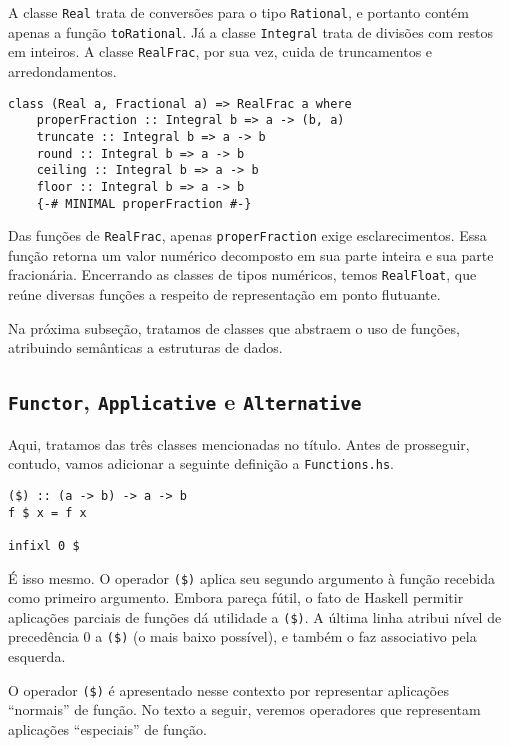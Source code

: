 \documentclass[a4paper]{article}
\begin{document}
A classe \texttt{Real} trata de conversões para o tipo \texttt{Rational}, e portanto contém apenas a função \texttt{toRational}.
Já a classe \texttt{Integral} trata de divisões com restos em inteiros.
A classe \texttt{RealFrac}, por sua vez, cuida de truncamentos e arredondamentos.

\begin{verbatim}
class (Real a, Fractional a) => RealFrac a where
	properFraction :: Integral b => a -> (b, a)
	truncate :: Integral b => a -> b
	round :: Integral b => a -> b
	ceiling :: Integral b => a -> b
	floor :: Integral b => a -> b
	{-# MINIMAL properFraction #-}
\end{verbatim}

Das funções de \texttt{RealFrac}, apenas \texttt{properFraction} exige esclarecimentos.
Essa função retorna um valor numérico decomposto em sua parte inteira e sua parte fracionária.
Encerrando as classes de tipos numéricos, temos \texttt{RealFloat}, que reúne diversas funções a respeito de representação em ponto flutuante.

Na próxima subseção, tratamos de classes que abstraem o uso de funções, atribuindo semânticas a estruturas de dados.

\subsection{\texttt{Functor}, \texttt{Applicative} e \texttt{Alternative}}

Aqui, tratamos das três classes mencionadas no título.
Antes de prosseguir, contudo, vamos adicionar a seguinte definição a \texttt{Functions.hs}.

\begin{verbatim}
($) :: (a -> b) -> a -> b
f $ x = f x

infixl 0 $
\end{verbatim}

É isso mesmo.
O operador \texttt{(\$)} aplica seu segundo argumento à função recebida como primeiro argumento.
Embora pareça fútil, o fato de Haskell permitir aplicações parciais de funções dá utilidade a \texttt{(\$)}.
A última linha atribui nível de precedência 0 a \texttt{(\$)} (o mais baixo possível), e também o faz associativo pela esquerda.

O operador \texttt{(\$)} é apresentado nesse contexto por representar aplicações ``normais'' de função.
No texto a seguir, veremos operadores que representam aplicações ``especiais'' de função.
\end{document}
